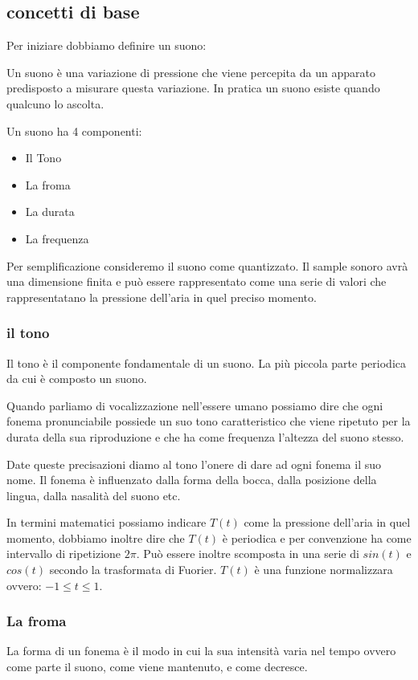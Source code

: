 \documentclass{article}
\begin{document}
\subsection{concetti di base}
Per iniziare dobbiamo definire un suono:

Un suono è una variazione di pressione che viene percepita da un apparato predisposto a misurare questa variazione.
In pratica un suono esiste quando qualcuno lo ascolta.

Un suono ha 4 componenti:
\begin{itemize}
    \item Il Tono
    \item La froma
    \item La durata
    \item La frequenza
\end{itemize}

Per semplificazione consideremo il suono come quantizzato. Il sample sonoro avrà una dimensione finita e può essere rappresentato come una serie di valori che rappresentatano la pressione dell'aria in quel preciso momento.

\subsubsection{il tono}
Il tono è il componente fondamentale di un suono. La più piccola parte periodica da cui è composto un suono.

Quando parliamo di vocalizzazione nell'essere umano possiamo dire che ogni fonema pronunciabile possiede un suo tono caratteristico che viene ripetuto per la durata della sua riproduzione e che ha come frequenza l'altezza del suono stesso.

Date queste precisazioni diamo al tono l'onere di dare ad ogni fonema il suo nome. Il fonema è influenzato dalla forma della bocca, dalla posizione della lingua, dalla nasalità del suono etc.

In termini matematici possiamo indicare $T(t)$ come la pressione dell'aria in quel momento, dobbiamo inoltre dire che $T(t)$ è periodica e per convenzione ha come intervallo di ripetizione $2\pi$. Può essere inoltre scomposta in una serie di $sin(t)$ e $cos(t)$ secondo la trasformata di Fuorier. $T(t)$ è una funzione normalizzara ovvero: $-1 \le t \le 1$.

\subsubsection{La froma}
La forma di un fonema è il modo in cui la sua intensità varia nel tempo ovvero come parte il suono, come viene mantenuto, e come decresce. 
\end{document}
